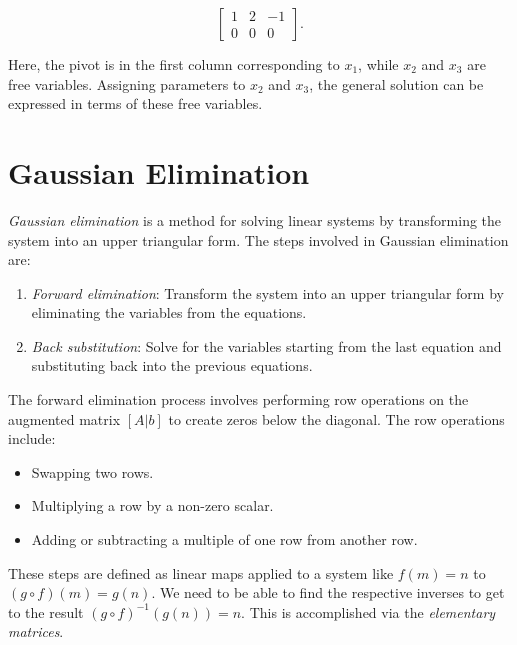 \[
    \begin{bmatrix}
        1 & 2 & -1 \\
        0 & 0 & 0
    \end{bmatrix}.
\]

Here, the pivot is in the first column corresponding to \( x_1 \), while \( x_2 \) and \( x_3 \) are free variables. Assigning parameters to \( x_2 \) 
and \( x_3 \), the general solution can be expressed in terms of these free variables.

\section{Gaussian Elimination}

\emph{Gaussian elimination} is a method for solving linear systems by transforming the system into an upper
triangular form. The steps involved in Gaussian elimination are:

\begin{enumerate}

    \item \emph{Forward elimination}: Transform the system into an upper triangular form by eliminating the
          variables from the equations.

    \item \emph{Back substitution}: Solve for the variables starting from the last equation and substituting
          back into the previous equations.

\end{enumerate}

The forward elimination process involves performing row operations on the augmented matrix
\([A | b]\) to create zeros below the diagonal. The row operations include:

\begin{itemize}

    \item Swapping two rows.

    \item Multiplying a row by a non-zero scalar.

    \item Adding or subtracting a multiple of one row from another row.

\end{itemize}

These steps are defined as linear maps applied to a system like \(f(m) = n\) to \((g \circ f)(m) = g(n)\). We need to be able to find the respective inverses 
to get to the result \((g \circ f)^{-1}({g(n)}) = n\). This is accomplished via the \emph{elementary matrices}.

